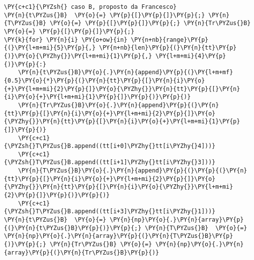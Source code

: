 \begin{Verbatim}[label=\makebox{\href{https://github.com/unipi-physics-labs/lab1-sheets/tree/main/snippy/plasduino_pendulum_testT.py}{https://github.com/.../plasduino\_pendulum\_testT.py}},commandchars=\\\{\}]
\PY{c+c1}{\PYZsh{} caso B, proposto da Francesco}
\PY{n}{t\PYZus{}B}  \PY{o}{=} \PY{p}{[}\PY{p}{]}\PY{p}{;} \PY{n}{T\PYZus{}B} \PY{o}{=} \PY{p}{[}\PY{p}{]}\PY{p}{;} \PY{n}{Tr\PYZus{}B} \PY{o}{=} \PY{p}{[}\PY{p}{]}\PY{p}{;}
\PY{k}{for} \PY{n}{i} \PY{o+ow}{in} \PY{n+nb}{range}\PY{p}{(}\PY{l+m+mi}{5}\PY{p}{,} \PY{n+nb}{len}\PY{p}{(}\PY{n}{tt}\PY{p}{)}\PY{o}{\PYZhy{}}\PY{l+m+mi}{1}\PY{p}{,} \PY{l+m+mi}{4}\PY{p}{)}\PY{p}{:}
    \PY{n}{t\PYZus{}B}\PY{o}{.}\PY{n}{append}\PY{p}{(}\PY{l+m+mf}{0.5}\PY{o}{*}\PY{p}{(}\PY{n}{tt}\PY{p}{[}\PY{n}{i}\PY{o}{+}\PY{l+m+mi}{2}\PY{p}{]}\PY{o}{\PYZhy{}}\PY{n}{tt}\PY{p}{[}\PY{n}{i}\PY{o}{+}\PY{l+m+mi}{1}\PY{p}{]}\PY{p}{)}\PY{p}{)}
    \PY{n}{Tr\PYZus{}B}\PY{o}{.}\PY{n}{append}\PY{p}{(}\PY{n}{tt}\PY{p}{[}\PY{n}{i}\PY{o}{+}\PY{l+m+mi}{2}\PY{p}{]}\PY{o}{\PYZhy{}}\PY{n}{tt}\PY{p}{[}\PY{n}{i}\PY{o}{+}\PY{l+m+mi}{1}\PY{p}{]}\PY{p}{)}
    \PY{c+c1}{\PYZsh{}T\PYZus{}B.append((tt[i+0]\PYZhy{}tt[i\PYZhy{}4]))}
    \PY{c+c1}{\PYZsh{}T\PYZus{}B.append((tt[i+1]\PYZhy{}tt[i\PYZhy{}3]))}
    \PY{n}{T\PYZus{}B}\PY{o}{.}\PY{n}{append}\PY{p}{(}\PY{p}{(}\PY{n}{tt}\PY{p}{[}\PY{n}{i}\PY{o}{+}\PY{l+m+mi}{2}\PY{p}{]}\PY{o}{\PYZhy{}}\PY{n}{tt}\PY{p}{[}\PY{n}{i}\PY{o}{\PYZhy{}}\PY{l+m+mi}{2}\PY{p}{]}\PY{p}{)}\PY{p}{)}
    \PY{c+c1}{\PYZsh{}T\PYZus{}B.append((tt[i+3]\PYZhy{}tt[i\PYZhy{}1]))}
\PY{n}{t\PYZus{}B}  \PY{o}{=} \PY{n}{np}\PY{o}{.}\PY{n}{array}\PY{p}{(}\PY{n}{t\PYZus{}B}\PY{p}{)}\PY{p}{;} \PY{n}{T\PYZus{}B}  \PY{o}{=} \PY{n}{np}\PY{o}{.}\PY{n}{array}\PY{p}{(}\PY{n}{T\PYZus{}B}\PY{p}{)}\PY{p}{;} \PY{n}{Tr\PYZus{}B} \PY{o}{=} \PY{n}{np}\PY{o}{.}\PY{n}{array}\PY{p}{(}\PY{n}{Tr\PYZus{}B}\PY{p}{)}


\end{Verbatim}
